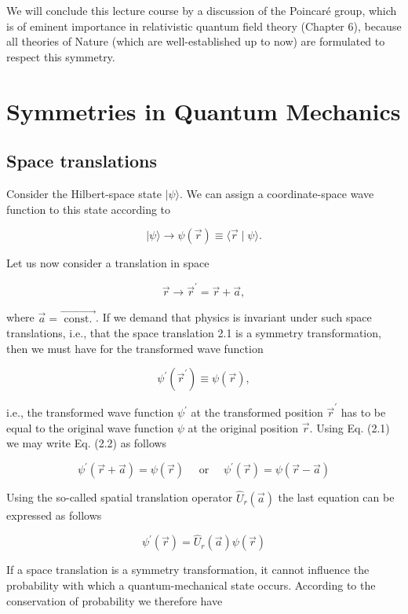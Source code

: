 \documentclass[10pt, letterpaper]{article}
\begin{document}
We will conclude this lecture course by a discussion of the Poincaré group, which is of eminent importance in relativistic quantum field theory (Chapter 6), because all theories of Nature (which are well-established up to now) are formulated to respect this symmetry.


\pagebreak

\section{Symmetries in Quantum Mechanics}

\subsection{Space translations}

Consider the Hilbert-space state $|\psi\rangle$. We can assign a coordinate-space wave function to this state according to

$$
|\psi\rangle \longrightarrow \psi(\vec{r}) \equiv\langle\vec{r} \mid \psi\rangle .
$$

Let us now consider a translation in space

$$
\vec{r} \longrightarrow \vec{r}^{\prime}=\vec{r}+\vec{a},
$$

where $\vec{a}=\overrightarrow{\text { const. }}$. If we demand that physics is invariant under such space translations, i.e., that the space translation 2.1 is a symmetry transformation, then we must have for the transformed wave function

$$
\psi^{\prime}\left(\vec{r}^{\prime}\right) \equiv \psi(\vec{r}),
$$

i.e., the transformed wave function $\psi^{\prime}$ at the transformed position $\vec{r}^{\prime}$ has to be equal to the original wave function $\psi$ at the original position $\vec{r}$. Using Eq. (2.1) we may write Eq. (2.2) as follows

$$
\psi^{\prime}(\vec{r}+\vec{a})=\psi(\vec{r}) \quad \text { or } \quad \psi^{\prime}(\vec{r})=\psi(\vec{r}-\vec{a})
$$

Using the so-called spatial translation operator $\hat{U}_{r}(\vec{a})$ the last equation can be expressed as follows

$$
\psi^{\prime}(\vec{r})=\hat{U}_{r}(\vec{a}) \psi(\vec{r})
$$

If a space translation is a symmetry transformation, it cannot influence the probability with which a quantum-mechanical state occurs. According to the conservation of probability we therefore have
\end{document}
